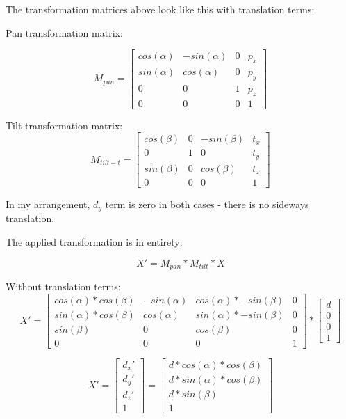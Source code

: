 \documentclass{article}
\begin{document}
The transformation matrices above look like this with translation
terms:

Pan transformation matrix:

\begin{equation}
M_{pan} =
\begin{bmatrix}
  cos(\alpha) & -sin(\alpha) &	0	& p_x\\
  sin(\alpha) &	cos(\alpha)	 &  0   & p_y\\
  0			  & 0			 &	1	& p_z\\
  0			  &	0			 &	0	& 1
\end{bmatrix}
\end{equation}


Tilt transformation matrix:
\begin{equation}
M_{tilt-t} =
\begin{bmatrix}
  cos(\beta)  & 0		     &	-sin(\beta)	& t_x\\
  0			  &	1			 &  0   		& t_y \\
  sin(\beta)  & 0			 &	cos(\beta)	& t_z \\
  0			  &	0			 &	0	& 1
\end{bmatrix}
\end{equation}

In my arrangement, $d_y$ term is zero in both cases - there is no sideways translation.

The applied transformation is in entirety:

\begin{equation}
X' = M_{pan} * M_{tilt} * X
\end{equation}

Without translation terms:
\begin{equation}
X' =
\begin{bmatrix}
cos(\alpha)*cos(\beta)	& -sin(\alpha) & cos(\alpha)*-sin(\beta) & 0\\
sin(\alpha)*cos(\beta) 	& cos(\alpha) & sin(\alpha)*-sin(\beta) & 0\\
sin(\beta)	&	0 & cos(\beta)	&	0\\
0 & 0 & 0 & 1
\end{bmatrix}
*
\begin{bmatrix}
d \\ 0 \\ 0 \\ 1
\end{bmatrix}
\end{equation}

\begin{equation}
X' = 
\begin{bmatrix}
d_x' \\
d_y' \\
d_z' \\
1
\end{bmatrix}
=
\begin{bmatrix}
d * cos(\alpha) * cos(\beta) \\
d * sin(\alpha) * cos(\beta) \\
d * sin(\beta) \\
1
\end{bmatrix}
\end{equation}
\end{document}

